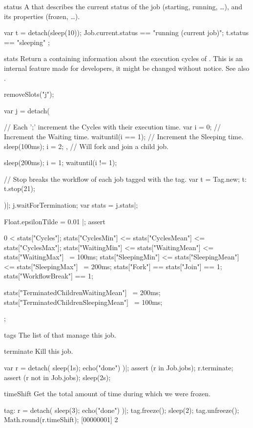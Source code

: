 \begin{urbiscriptapi}
\item[status] A  that describes the current status of the
  job (starting, running, \ldots), and its properties (frozen, \ldots).
\begin{urbiassert}
var t = detach(sleep(10));
Job.current.status == "running (current job)";
t.status == "sleeping" ;
\end{urbiassert}

\item[stats]%
  Return a  containing information about the execution
  cycles of \urbi.  This is an internal feature made for developers, it
  might be changed without notice.  See also .
\begin{urbicomment}
removeSlots("j");
\end{urbicomment}
\begin{urbiscript}
var j = detach({
  // Each ';' increment the Cycles with their execution time.
  var i = 0;
  {
    // Increment the Waiting time.
    waituntil(i == 1);
    // Increment the Sleeping time.
    sleep(100ms);
    i = 2;
  }, // Will fork and join a child job.

  sleep(200ms);
  i = 1;
  waituntil(i != 1);

  // Stop breaks the workflow of each job tagged with the tag.
  var t = Tag.new;
  t: t.stop(21);
})|;
j.waitForTermination;
var stats = j.stats|;

Float.epsilonTilde = 0.01 |;
assert
{
  0 < stats["Cycles"];
  stats["CyclesMin"] <= stats["CyclesMean"] <= stats["CyclesMax"];
  stats["WaitingMin"] <= stats["WaitingMean"] <= stats["WaitingMax"] ~= 100ms;
  stats["SleepingMin"] <= stats["SleepingMean"] <= stats["SleepingMax"] ~= 200ms;
  stats["Fork"] == stats["Join"] == 1;
  stats["WorkflowBreak"] == 1;

  stats["TerminatedChildrenWaitingMean"] ~= 200ms;
  stats["TerminatedChildrenSleepingMean"] ~= 100ms;
};
\end{urbiscript}


\item[tags] The list of  that manage this job.

\item[terminate]  Kill this job.
\begin{urbiscript}
var r = detach({ sleep(1s); echo("done") })|;
assert (r in Job.jobs);
r.terminate;
assert (r not in Job.jobs);
sleep(2s);
\end{urbiscript}

\item[timeShift]
  Get the total amount of time during which we were frozen.
\begin{urbiscript}
tag: r = detach({ sleep(3); echo("done") })|;
tag.freeze();
sleep(2);
tag.unfreeze();
Math.round(r.timeShift);
[00000001] 2
\end{urbiscript}


\end{urbiscriptapi}
